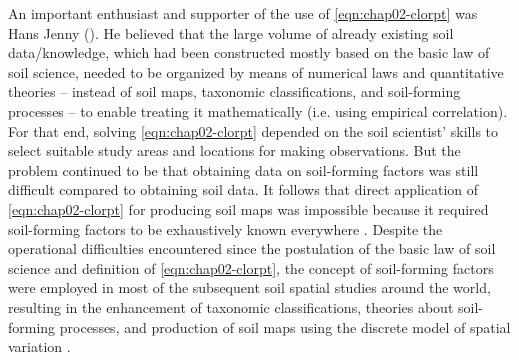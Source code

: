 An important enthusiast and supporter of the use of \autoref{eqn:chap02-clorpt} was Hans Jenny 
(\citeyear{Jenny1941}). He believed that the large volume of already existing soil data/knowledge, which had 
been constructed mostly based on the basic law of soil science, needed to be organized by means of numerical 
laws and quantitative theories -- instead of soil maps, taxonomic classifications, and soil-forming processes 
-- to enable treating it mathematically (i.e. using empirical correlation). For that end, solving 
\autoref{eqn:chap02-clorpt} depended on the soil scientist' skills to select suitable study areas and locations 
for making observations. But the problem continued to be that obtaining data on soil-forming factors was still 
difficult compared to obtaining soil data. It follows that direct application of \autoref{eqn:chap02-clorpt} 
for producing soil maps was impossible because it required soil-forming factors to be exhaustively known 
everywhere \cite{Jenny1941}. Despite the operational difficulties encountered since the postulation of the 
basic law of soil science and definition of \autoref{eqn:chap02-clorpt}, the concept of soil-forming factors 
were employed in most of the subsequent soil spatial studies around the world, resulting in the enhancement of 
taxonomic classifications, theories about soil-forming processes, and production of soil maps using the 
discrete model of spatial variation \cite{Schelling1970, Hudson1992, BockheimEtAl2000, Legros2006, 
KrasilnikovEtAl2009b, HarteminkEtAl2013}.

